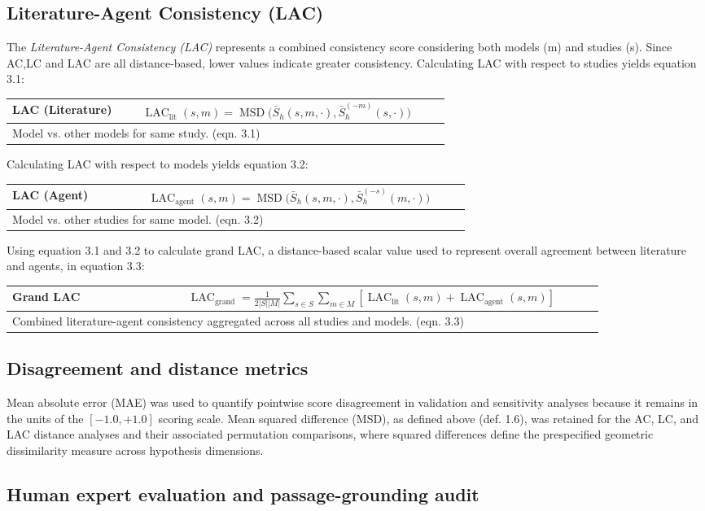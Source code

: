 \documentclass[12pt]{article}
\renewcommand{\arraystretch}{1.06}
\newcommand{\EquationBox}[3]{%
  \begin{center}
  \begingroup
  \small
  \setlength{\tabcolsep}{6pt}%
  \renewcommand{\arraystretch}{1.18}%
  \begin{tabular}{|p{0.27\linewidth}|p{0.64\linewidth}|}
  \hline
  \textbf{#1} & #2 \\
  \hline
  \multicolumn{2}{|p{0.94\linewidth}|}{#3} \\
  \hline
  \end{tabular}
  \endgroup
  \end{center}
}
\begin{document}
\subsection{Literature-Agent Consistency (LAC)}\label{literature-agent-consistency-lac}

The \emph{Literature-Agent Consistency (LAC)} represents a combined consistency score considering both models (m) and studies (s). Since AC,LC and LAC are all distance-based, lower values indicate greater consistency. Calculating LAC with respect to studies yields equation 3.1:
\EquationBox{LAC (Literature)}{\(\displaystyle \operatorname{LAC}_{\mathrm{lit}}(s,m)=\operatorname{MSD}\bigl(\bar{S}_h(s,m,\cdot),\bar{S}_h^{(-m)}(s,\cdot)\bigr)\)}{Model vs. other models for same study. (eqn. 3.1)}
Calculating LAC with respect to models yields equation 3.2:
\EquationBox{LAC (Agent)}{\(\displaystyle \operatorname{LAC}_{\mathrm{agent}}(s,m)=\operatorname{MSD}\bigl(\bar{S}_h(s,m,\cdot),\bar{S}_h^{(-s)}(m,\cdot)\bigr)\)}{Model vs. other studies for same model. (eqn. 3.2)}
Using equation 3.1 and 3.2 to calculate grand LAC, a distance-based scalar value used to represent overall agreement between literature and agents, in equation 3.3:
\EquationBox{Grand LAC}{\(\displaystyle \operatorname{LAC}_{\mathrm{grand}}=\frac{1}{2|S||M|}\sum_{s\in S}\sum_{m\in M}\left[\operatorname{LAC}_{\mathrm{lit}}(s,m)+\operatorname{LAC}_{\mathrm{agent}}(s,m)\right]\)}{Combined literature-agent consistency aggregated across all studies and models. (eqn. 3.3)}


\subsection{Disagreement and distance metrics}\label{disagreement-and-distance-metrics}

Mean absolute error (MAE) was used to quantify pointwise score disagreement in validation and sensitivity analyses because it remains in the units of the $[-1.0, +1.0]$ scoring scale. Mean squared difference (MSD), as defined above (def. 1.6), was retained for the AC, LC, and LAC distance analyses and their associated permutation comparisons, where squared differences define the prespecified geometric dissimilarity measure across hypothesis dimensions.

\subsection{Human expert evaluation and passage-grounding audit}\label{human-expert-evaluation}
\end{document}
